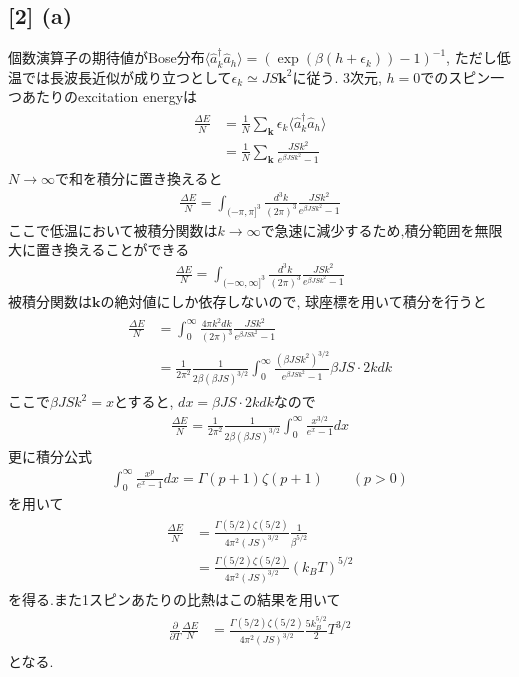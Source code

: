 \documentclass[uplatex,a4j,11pt,dvipdfmx]{jsarticle}
\begin{document}
\subsection*{[2] (a)}
個数演算子の期待値がBose分布$\langle\hat{a}_k^\dagger\hat{a}_h\rangle=(\exp(\beta(h+\epsilon_k))-1)^{-1}$, 
ただし低温では長波長近似が成り立つとして$\epsilon_k\simeq JS{\bm k}^2$に従う.
3次元, $h=0$でのスピン一つあたりのexcitation energyは
\begin{align}
  \begin{split}
    \frac{\Delta E}{N}&=\frac{1}{N}\sum_{\bm k}\epsilon_k\langle\hat{a}_k^\dagger\hat{a}_h\rangle\\
    &=\frac{1}{N}\sum_{\bm k}\frac{JSk^2}{e^{\beta JSk^2}-1}
  \end{split}
\end{align}
$N\rightarrow\infty$で和を積分に置き換えると
\begin{align}
  \frac{\Delta E}{N}=\int_{(-\pi,\pi]^3}\frac{d^3k}{(2\pi)^3}\frac{JSk^2}{e^{\beta JSk^2}-1}
\end{align}
ここで低温において被積分関数は$k\rightarrow\infty$で急速に減少するため,積分範囲を無限大に置き換えることができる
\begin{align}
  \frac{\Delta E}{N}=\int_{(-\infty,\infty]^3}\frac{d^3k}{(2\pi)^3}\frac{JSk^2}{e^{\beta JSk^2}-1}
\end{align}
被積分関数は$\bm k$の絶対値にしか依存しないので, 球座標を用いて積分を行うと
\begin{align}
  \begin{split}
    \frac{\Delta E}{N}&=\int_0^\infty\frac{4\pi k^2dk}{(2\pi)^3}\frac{JSk^2}{e^{\beta JSk^2}-1}\\
    &=\frac{1}{2\pi^2}\frac{1}{2\beta(\beta JS)^{3/2}}\int_0^\infty\frac{(\beta JSk^2)^{3/2}}{e^{\beta JSk^2}-1}\beta JS\cdot 2kdk
  \end{split}
\end{align}
ここで$\beta JSk^2=x$とすると, $dx=\beta JS\cdot2kdk$なので
\begin{align}
  \frac{\Delta E}{N}=\frac{1}{2\pi^2}\frac{1}{2\beta(\beta JS)^{3/2}}\int_0^\infty\frac{x^{3/2}}{e^x-1}dx
\end{align}
更に積分公式
\begin{align}
  \int_0^\infty\frac{x^p}{e^x-1}dx=\Gamma(p+1)\zeta(p+1)\qquad (p>0)
\end{align}
を用いて
\begin{align}
  \begin{split}
    \frac{\Delta E}{N}&=\frac{\Gamma(5/2)\zeta(5/2)}{4\pi^2(JS)^{3/2}}\frac{1}{\beta^{5/2}}\\
    &=\frac{\Gamma(5/2)\zeta(5/2)}{4\pi^2(JS)^{3/2}}(k_BT)^{5/2}
  \end{split}
\end{align}
を得る.また1スピンあたりの比熱はこの結果を用いて
\begin{align}
  \begin{split}
    \frac{\partial}{\partial T}\frac{\Delta E}{N}
    &=\frac{\Gamma(5/2)\zeta(5/2)}{4\pi^2(JS)^{3/2}}\frac{5k_B^{5/2}}{2}T^{3/2}
  \end{split}
\end{align}
となる.
\end{document}
